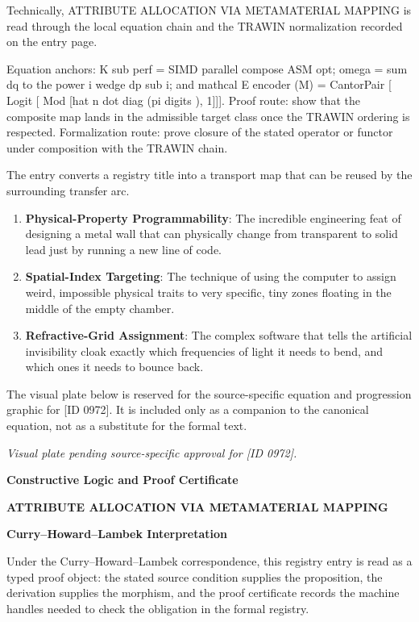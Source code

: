 Technically, ATTRIBUTE ALLOCATION VIA METAMATERIAL MAPPING is read through the local equation chain and the TRAWIN normalization recorded on the entry page.

Equation anchors: K sub perf = SIMD parallel compose ASM opt; omega = sum dq to the power i wedge dp sub i; and mathcal E encoder (M) = CantorPair [ Logit [ Mod [hat n dot diag (pi digits ), 1]]]. Proof route: show that the composite map lands in the admissible target class once the TRAWIN ordering is respected. Formalization route: prove closure of the stated operator or functor under composition with the TRAWIN chain.

The entry converts a registry title into a transport map that can be reused by the surrounding transfer arc.
\endgroup

\begin{enumerate}[leftmargin=1.6em,itemsep=6pt,topsep=4pt]
\item \textbf{Physical-Property Programmability}: The incredible engineering feat of designing a metal wall that can physically change from transparent to solid lead just by running a new line of code.
\item \textbf{Spatial-Index Targeting}: The technique of using the computer to assign weird, impossible physical traits to very specific, tiny zones floating in the middle of the empty chamber.
\item \textbf{Refractive-Grid Assignment}: The complex software that tells the artificial invisibility cloak exactly which frequencies of light it needs to bend, and which ones it needs to bounce back.
\end{enumerate}

\begingroup\footnotesize\sloppy
The visual plate below is reserved for the source-specific equation and progression graphic for [ID 0972]. It is included only as a companion to the canonical equation, not as a substitute for the formal text.
\par\endgroup
\begingroup\footnotesize\itshape
Visual plate pending source-specific approval for [ID 0972].
\par\endgroup

\clearpage
\begingroup\tzpsupportsetup
\noindent\textbf{\fontsize{10.8pt}{12.8pt}\selectfont [ID 0972] Constructive Logic and Proof Certificate}\par
\noindent\textbf{\fontsize{10pt}{12pt}\selectfont ATTRIBUTE ALLOCATION VIA METAMATERIAL MAPPING}\par
\vspace{0.45em}
\begingroup
\footnotesize
\setlength{\parskip}{0.22em}
\setlength{\parindent}{0pt}
\noindent\textbf{Curry--Howard--Lambek Interpretation}\par
Under the Curry--Howard--Lambek correspondence, this registry entry is read as a typed proof
object: the stated source condition supplies the proposition, the derivation supplies the
morphism, and the proof certificate records the machine handles needed to check the obligation
in the formal registry.

